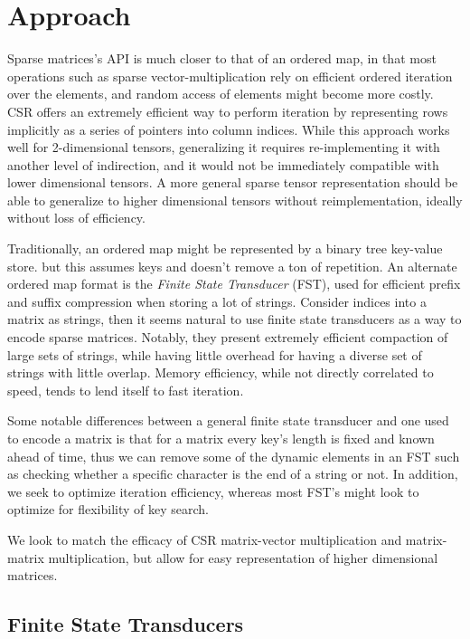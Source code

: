 \documentclass[12pt]{article}
\begin{document}
\section{Approach}

Sparse matrices's API is much closer to that of an ordered map, in that most operations
such as sparse vector-multiplication rely on efficient ordered iteration over the elements, and
random access of elements might become more costly. CSR offers an extremely efficient way to
perform iteration by representing rows implicitly as a series of pointers into column indices.
While this approach works well for 2-dimensional tensors, generalizing it requires
re-implementing it with another level of indirection, and it would not be immediately compatible
with lower dimensional tensors. A more general sparse tensor representation should be able to
generalize to higher dimensional tensors without reimplementation, ideally without loss of
efficiency.

Traditionally, an ordered map might be represented by a binary tree key-value store. but this
assumes keys and doesn't remove a ton of repetition. An alternate ordered map format is the
\textit{Finite State Transducer} (FST), used for efficient prefix and suffix compression when
storing a lot of strings. Consider indices into a matrix as strings, then it seems natural to
use finite state transducers as a way to encode sparse matrices. Notably, they present extremely
efficient compaction of large sets of strings, while having little overhead for having a diverse
set of strings with little overlap. Memory efficiency, while not directly correlated to speed,
tends to lend itself to fast iteration.

Some notable differences between a general finite state transducer and one used to encode a
matrix is that for a matrix every key's length is fixed and known ahead of time, thus we can
remove some of the dynamic elements in an FST such as checking whether a specific character is
the end of a string or not. In addition, we seek to optimize iteration efficiency, whereas most
FST's might look to optimize for flexibility of key search.

We look to match the efficacy of CSR matrix-vector multiplication and matrix-matrix
multiplication, but allow for easy representation of higher dimensional matrices.

\subsection{Finite State Transducers}
\end{document}
